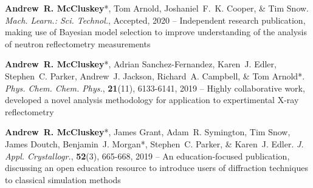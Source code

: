 \begin{cventriesy}
  \cventryy
    {
      \begin{cvitemsy}
        \item {\textbf{Andrew~R. McCluskey}*, Tom Arnold, Joshaniel~F.~K. Cooper, \& Tim Snow. \emph{Mach. Learn.: Sci. Technol.}, Accepted, 2020 -- Independent research publication, making use of Bayesian model selection to improve understanding of the analysis of neutron reflectometry measurements}
    \vspace{1mm}
        \item {\textbf{Andrew~R. McCluskey}*, Adrian Sanchez-Fernandez, Karen~J. Edler, Stephen~C. Parker, Andrew~J. Jackson, Richard~A. Campbell, \& Tom Arnold*. \emph{Phys. Chem. Chem. Phys.}, \textbf{21}(11), 6133-6141, 2019 -- Highly collaborative work, developed a novel analysis methodology for application to expertimental X-ray reflectometry}
    \vspace{1mm}
        \item {\textbf{Andrew~R. McCluskey}*, James Grant, Adam~R. Symington, Tim Snow, James Doutch, Benjamin~J. Morgan*, Stephen~C. Parker, \& Karen~J. Edler. \emph{J. Appl. Crystallogr.}, \textbf{52}(3), 665-668, 2019 -- An education-focused publication, discussing an open education resource to introduce users of diffraction techniques to classical simulation methods} 
      \end{cvitemsy}
    }
\end{cventriesy}